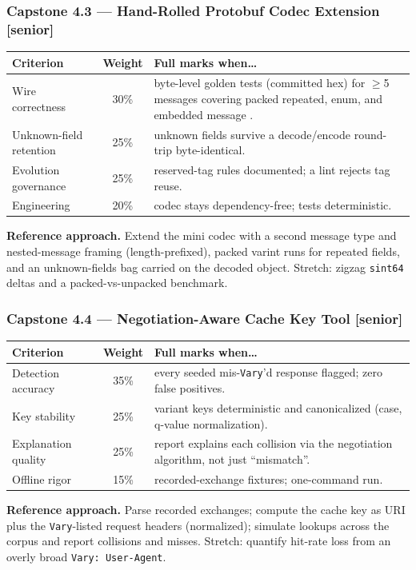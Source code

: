 \subsubsection*{Capstone 4.3 --- Hand-Rolled Protobuf Codec Extension [senior]}
\begin{center}\small
\begin{tabularx}{\textwidth}{l c X}
\toprule
\textbf{Criterion} & \textbf{Weight} & \textbf{Full marks when\ldots} \\
\midrule
Wire correctness & 30\% & byte-level golden tests (committed hex) for $\geq$5 messages covering packed repeated, enum, and embedded message \cite{protobufdocs}. \\
Unknown-field retention & 25\% & unknown fields survive a decode/encode round-trip byte-identical. \\
Evolution governance & 25\% & reserved-tag rules documented; a lint rejects tag reuse. \\
Engineering & 20\% & codec stays dependency-free; tests deterministic. \\
\bottomrule
\end{tabularx}
\end{center}
\textbf{Reference approach.} Extend the mini codec with a second message
type and nested-message framing (length-prefixed), packed varint runs for
repeated fields, and an unknown-fields bag carried on the decoded object.
Stretch: zigzag \texttt{sint64} deltas and a packed-vs-unpacked benchmark.

\subsubsection*{Capstone 4.4 --- Negotiation-Aware Cache Key Tool [senior]}
\begin{center}\small
\begin{tabularx}{\textwidth}{l c X}
\toprule
\textbf{Criterion} & \textbf{Weight} & \textbf{Full marks when\ldots} \\
\midrule
Detection accuracy & 35\% & every seeded mis-\texttt{Vary}'d response flagged; zero false positives. \\
Key stability & 25\% & variant keys deterministic and canonicalized (case, q-value normalization). \\
Explanation quality & 25\% & report explains each collision via the negotiation algorithm, not just ``mismatch''. \\
Offline rigor & 15\% & recorded-exchange fixtures; one-command run. \\
\bottomrule
\end{tabularx}
\end{center}
\textbf{Reference approach.} Parse recorded exchanges; compute the cache
key as URI plus the \texttt{Vary}-listed request headers (normalized);
simulate lookups across the corpus and report collisions and misses.
Stretch: quantify hit-rate loss from an overly broad \texttt{Vary:
User-Agent}.

